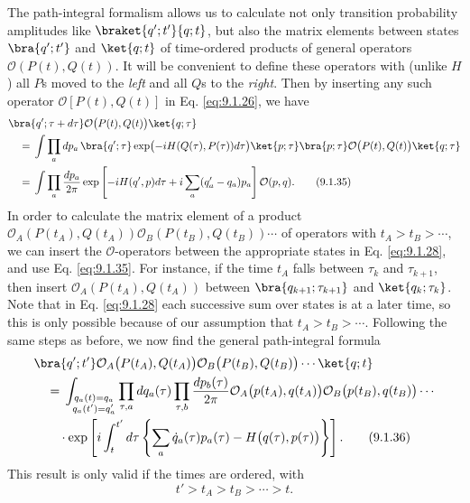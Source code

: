The path-integral formalism allows us to calculate not only transition
probability amplitudes like $\braket{q';t'}{q;t}$, but also the matrix
elements between states $\bra{q';t'}$ and $\ket{q;t}$ of time-ordered
products of general operators $\mathcal{O}(P(t),Q(t))$. It will be convenient
to define these operators with (unlike $H$) all $P$s moved to the \emph{left}
and all $Q$s to the \emph{right}. Then by inserting any such operator
$\mathcal{O}[P(t),Q(t)]$ in Eq. \eqref{eq:9.1.26}, we have
\begin{align}
  &\bra{q';\tau+d\tau}\mathcal{O}\bigl(P(t),Q(t)\bigr)\ket{q;\tau}
  \notag\\
  &\quad={}
  \int\prod_a dp_a\,
  \bra{q';\tau}\exp\bigl(-iH(Q(\tau),P(\tau))d\tau\bigr)\ket{p;\tau}
  \bra{p;\tau}\mathcal{O}\bigl(P(t),Q(t)\bigr)\ket{q;\tau}
  \notag\\
  &\quad={}
  \int\prod_a\frac{dp_a}{2\pi}
  \exp\left[-iH(q',p)d\tau+i\sum_a(q'_a-q_a)p_a\right]
  \mathcal{O}(p,q).
  \tag{9.1.35}\label{eq:9.1.35}
\end{align}
In order to calculate the matrix element of a product
$\mathcal{O}_A(P(t_A),Q(t_A))\mathcal{O}_B(P(t_B),Q(t_B))\cdots$ of
operators with $t_A>t_B>\cdots$, we can insert the $\mathcal{O}$-operators
between the appropriate states in Eq. \eqref{eq:9.1.28}, and use Eq. \eqref{eq:9.1.35}. For
instance, if the time $t_A$ falls between $\tau_k$ and $\tau_{k+1}$, then
insert $\mathcal{O}_A(P(t_A),Q(t_A))$ between $\bra{q_{k+1};\tau_{k+1}}$
and $\ket{q_k;\tau_k}$. Note that in Eq. \eqref{eq:9.1.28} each successive sum over
states is at a later time, so this is only possible because of our assumption
that $t_A>t_B>\cdots$. Following the same steps as before, we now find the
general path-integral formula
\begin{align}
  &\bra{q';t'}\mathcal{O}_A\bigl(P(t_A),Q(t_A)\bigr)
  \mathcal{O}_B\bigl(P(t_B),Q(t_B)\bigr)\cdots\ket{q;t}
  \notag\\
  &\quad={}
  \int_{\substack{q_a(t)=q_a\\q_a(t')=q'_a}}
  \prod_{\tau,a}dq_a(\tau)\prod_{\tau,b}\frac{dp_b(\tau)}{2\pi}
  \mathcal{O}_A\bigl(p(t_A),q(t_A)\bigr)
  \mathcal{O}_B\bigl(p(t_B),q(t_B)\bigr)\cdots
  \notag\\
  &\qquad\cdot\exp\left[i\int_t^{t'}d\tau
  \left\{\sum_a\dot q_a(\tau)p_a(\tau)
  -H\bigl(q(\tau),p(\tau)\bigr)\right\}\right].
  \tag{9.1.36}\label{eq:9.1.36}
\end{align}
This result is only valid if the times are ordered, with
\begin{equation}
  t'>t_A>t_B>\cdots>t.
  \tag{9.1.37}\label{eq:9.1.37}
\end{equation}
